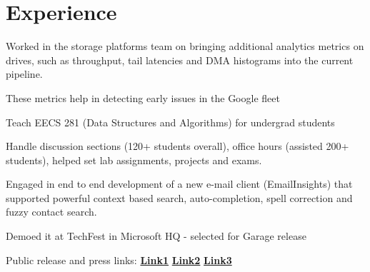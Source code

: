 \documentclass[]{resume-openfont}
\begin{document}
\hfill
\begin{minipage}[t]{0.74\textwidth} 


\section{Experience}

\vspace{\topsep} %
\begin{tightemize}
\item Worked in the storage platforms team on bringing additional analytics metrics on drives, such as throughput, tail latencies and DMA histograms into the current pipeline.
\item These metrics help in detecting early issues in the Google fleet
\end{tightemize}
\sectionsep

\begin{tightemize}
\item Teach EECS 281 (Data Structures and Algorithms) for undergrad students
\item Handle discussion sections (120+ students overall), office hours (assisted 200+ students), helped set lab assignments, projects and exams.
\end{tightemize}
\sectionsep

\begin{tightemize}
\item Engaged in end to end development of a new e-mail client (EmailInsights) that supported powerful context based search, auto-completion, spell correction and fuzzy contact search. 
\item Demoed it at TechFest in Microsoft HQ - selected for Garage release
\item Public release and press links: 
\textbf{\href{http://www.zdnet.com/product/email-insights/}{Link1}}
\textbf{\href{https://www.microsoft.com/en-us/garage/profiles/email-insights/}{Link2}}
\textbf{\href{https://www.neowin.net/news/microsoft-garage-has-created-a-lightweight-email-solution-email-insights}{Link3}}


\end{tightemize}
\end{minipage}
\end{document}
